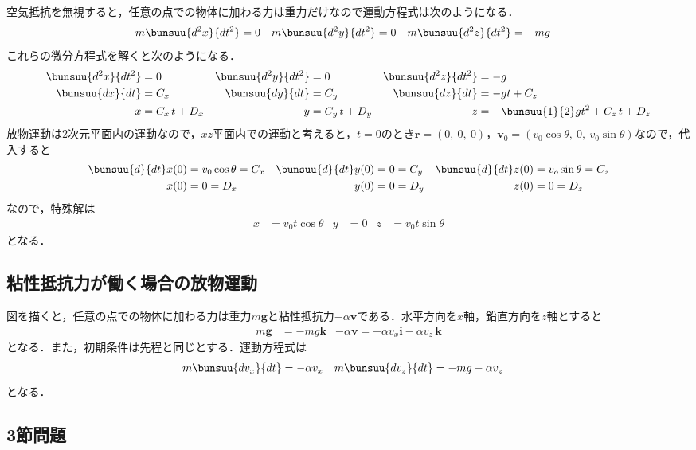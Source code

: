 空気抵抗を無視すると，任意の点での物体に加わる力は重力だけなので運動方程式は次のようになる．
\begin{align}
	&m\bunsuu{d^2 x}{dt^2} = 0 & &m\bunsuu{d^2 y}{dt^2} = 0 & &m\bunsuu{d^2 z}{dt^2} = -mg
\end{align}
これらの微分方程式を解くと次のようになる．
\begin{align*}
	\bunsuu{d^2 x}{dt^2} &= 0 & \bunsuu{d^2 y}{dt^2} &= 0 & \bunsuu{d^2 z}{dt^2} &= -g\\
	\bunsuu{dx}{dt} &= C_x & \bunsuu{dy}{dt} &= C_y & \bunsuu{dz}{dt} &= -gt + C_z\\
	x &= C_x\,t + D_x & y &= C_y\,t + D_y & z &= -\bunsuu{1}{2}gt^2 + C_z\,t + D_z
\end{align*}
放物運動は2次元平面内の運動なので，$xz$平面内での運動と考えると，$t = 0$のとき$\bm{r} = (0,\ 0,\ 0)$，$\bm{v}_0 = (v_0\cos\theta,\ 0,\ v_0\sin\theta)$なので，代入すると
\begin{align*}
	\bunsuu{d}{dt}x(0) &= v_0\cos\theta = C_x &
	\bunsuu{d}{dt}y(0) &= 0 = C_y &
	\bunsuu{d}{dt}z(0) &= v_o\sin\theta = C_z\\
	x(0) &= 0 = D_x &
	y(0) &= 0 = D_y &
	z(0) &= 0 = D_z
\end{align*}
なので，特殊解は
\begin{align}
	x &= v_0t\cos\theta & y &= 0 & z &= v_0 t\sin\theta
\end{align}
となる．



\subsection{粘性抵抗力が働く場合の放物運動}

図を描くと，任意の点での物体に加わる力は重力$m\bm{g}$と粘性抵抗力$-\alpha\bm{v}$である．水平方向を$x$軸，鉛直方向を$z$軸とすると
\begin{align*}
	m\bm{g} &= -mg\bm{k} & -\alpha\bm{v} = -\alpha v_x \bm{i} - \alpha v_z\,\bm{k}
\end{align*}
となる．また，初期条件は先程と同じとする．運動方程式は
\begin{align}
	m\bunsuu{d v_x}{dt} &= -\alpha v_x & m\bunsuu{d v_z}{dt} &= -mg - \alpha v_z
\end{align}
となる．










\subsection{3節問題}

